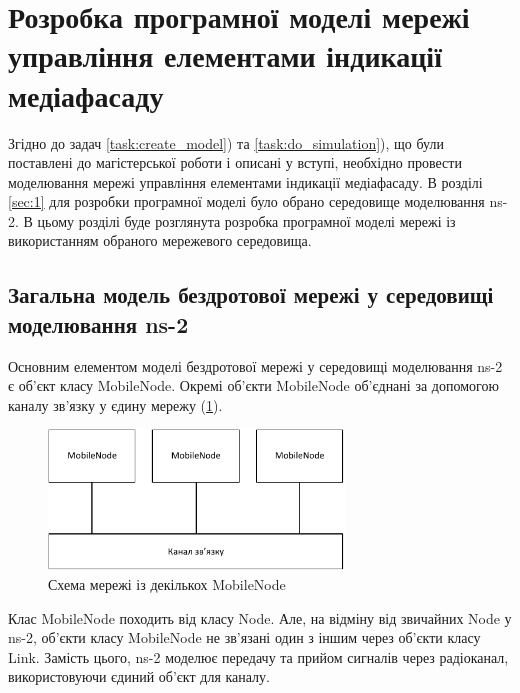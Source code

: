 \documentclass[a4paper,ukrainian,utf8,nocolumnsxix,nocolumnxxxii,nocolumnxxxi,floatsection,equationsection]{eskdtext}
\begin{document}



\section{Розробка програмної моделі мережі управління елементами індикації медіафасаду}
\label{sec:3:model:development}

Згідно до задач \ref{task:create_model}) та \ref{task:do_simulation}), що були поставлені до магістерської роботи і описані у вступі, необхідно провести моделювання мережі управління елементами індикації медіафасаду. В розділі \ref{sec:1} для розробки програмної моделі було обрано середовище моделювання ns-2. В цьому розділі буде розглянута розробка програмної моделі мережі із використанням обраного мережевого середовища.

\subsection{Загальна модель бездротової мережі у середовищі моделювання ns-2}
\label{sub:ns:general:network:model}

Основним елементом моделі бездротової мережі у середовищі моделювання ns-2 є об'єкт класу MobileNode. Окремі об'єкти MobileNode об'єднані за допомогою каналу зв'язку у єдину мережу (\cref{fig:mobile_node:network}). 


\begin{figure}[bth]
	\centering
	\includegraphics[width=0.7\textwidth]{img/mn_network.pdf}
	\caption{\label{fig:mobile_node:network}Схема мережі із декількох MobileNode}
\end{figure}

Клас MobileNode походить від класу Node. Але, на відміну від звичайних Node у ns-2, об'єкти класу MobileNode не зв'язані один з іншим через об'єкти класу Link. Замість цього, ns-2 моделює передачу та прийом сигналів через радіоканал, використовуючи єдиний об'єкт для каналу.
\end{document}
